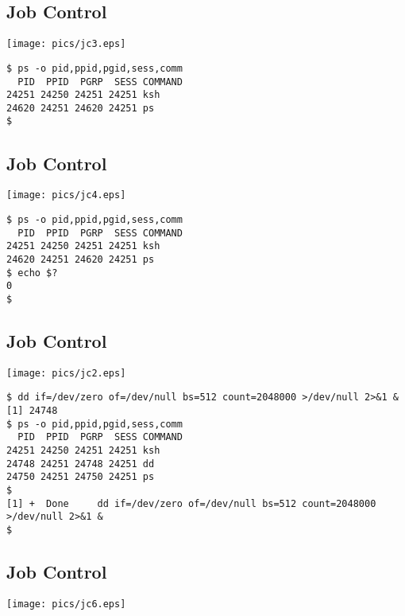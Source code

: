 \documentclass[xga]{xdvislides}
\begin{document}
\subsection{Job Control}
\begin{center}
	\texttt{[image: pics/jc3.eps]}
\end{center}
\addvspace{.5in}
\begin{verbatim}
$ ps -o pid,ppid,pgid,sess,comm
  PID  PPID  PGRP  SESS COMMAND
24251 24250 24251 24251 ksh
24620 24251 24620 24251 ps
$
\end{verbatim}

\subsection{Job Control}
\begin{center}
	\texttt{[image: pics/jc4.eps]}
\end{center}
\addvspace{.5in}
\begin{verbatim}
$ ps -o pid,ppid,pgid,sess,comm
  PID  PPID  PGRP  SESS COMMAND
24251 24250 24251 24251 ksh
24620 24251 24620 24251 ps
$ echo $?
0
$
\end{verbatim}

\subsection{Job Control}
\begin{center}
	\texttt{[image: pics/jc2.eps]}
\end{center}
\begin{verbatim}
$ dd if=/dev/zero of=/dev/null bs=512 count=2048000 >/dev/null 2>&1 &
[1]	24748
$ ps -o pid,ppid,pgid,sess,comm
  PID  PPID  PGRP  SESS COMMAND
24251 24250 24251 24251 ksh
24748 24251 24748 24251 dd
24750 24251 24750 24251 ps
$
[1] +  Done     dd if=/dev/zero of=/dev/null bs=512 count=2048000 >/dev/null 2>&1 &
$
\end{verbatim}

\subsection{Job Control}
\begin{center}
	\texttt{[image: pics/jc6.eps]}
\end{center}
\end{document}
